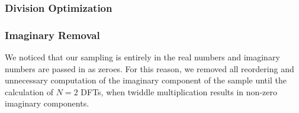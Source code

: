 \documentclass{article}
\begin{document}
		\subsubsection{Division Optimization}
		\subsubsection{Imaginary Removal}
			We noticed that our sampling is entirely in the real numbers and imaginary numbers are passed in as zeroes.
			For this reason, we removed all reordering and unnecessary computation of the imaginary component of the sample until the calculation of $N=2$ DFTs, when twiddle multiplication results in non-zero imaginary components.
\end{document}
